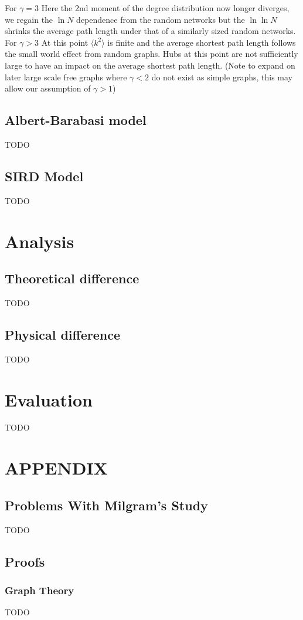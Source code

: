 \documentclass{article}
\begin{document}
            For $\gamma =3$ Here the 2nd moment of the degree distribution now longer diverges, we regain the $\ln N$ dependence from the random networks but the $\ln\ln N$ shrinks the average path length under that of a similarly sized random networks.\\
            For $\gamma > 3$ At this point $\langle k^2 \rangle$ is finite and the average shortest path length follows the small world effect from random graphs. Hubs at this point are not sufficiently large to have an impact on the average shortest path length.
            (Note to expand on later large scale free graphs where $\gamma < 2$ do not exist as simple graphs, this may allow our assumption of $\gamma >1$)
        \subsection{Albert-Barabasi model}
        TODO
        \subsection{SIRD Model}
        TODO
    \section{Analysis}
        \subsection{Theoretical difference}
        TODO
        \subsection{Physical difference}
        TODO
        
        
    \section{Evaluation}
    TODO
    \section{APPENDIX}
        \subsection{Problems With Milgram's Study}
        TODO
        \subsection{Proofs}
            \subsubsection{Graph Theory}
            TODO
\end{document}
